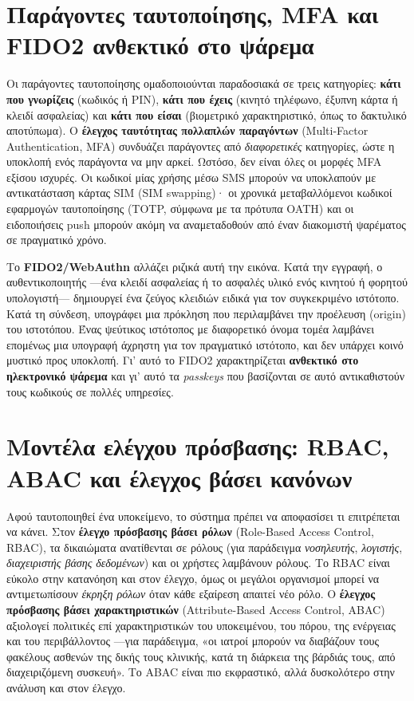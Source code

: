 \documentclass[11pt,openany]{book}
\begin{document}
\section{Παράγοντες ταυτοποίησης, MFA και FIDO2 ανθεκτικό στο ψάρεμα}\label{sec:8.2}
Οι παράγοντες ταυτοποίησης ομαδοποιούνται παραδοσιακά σε τρεις κατηγορίες: \textbf{κάτι που γνωρίζεις} (κωδικός ή PIN), \textbf{κάτι που έχεις} (κινητό τηλέφωνο, έξυπνη κάρτα ή κλειδί ασφαλείας) και \textbf{κάτι που είσαι} (βιομετρικό χαρακτηριστικό, όπως το δακτυλικό αποτύπωμα). Ο \textbf{έλεγχος ταυτότητας πολλαπλών παραγόντων} (Multi-Factor Authentication, MFA) συνδυάζει παράγοντες από \emph{διαφορετικές} κατηγορίες, ώστε η υποκλοπή ενός παράγοντα να μην αρκεί. Ωστόσο, δεν είναι όλες οι μορφές MFA εξίσου ισχυρές. Οι κωδικοί μίας χρήσης μέσω SMS μπορούν να υποκλαπούν με αντικατάσταση κάρτας SIM (SIM swapping)· οι χρονικά μεταβαλλόμενοι κωδικοί εφαρμογών ταυτοποίησης (TOTP, σύμφωνα με τα πρότυπα OATH) και οι ειδοποιήσεις push μπορούν ακόμη να αναμεταδοθούν από έναν διακομιστή ψαρέματος σε πραγματικό χρόνο.

Το \textbf{FIDO2/WebAuthn} αλλάζει ριζικά αυτή την εικόνα. Κατά την εγγραφή, ο αυθεντικοποιητής —ένα κλειδί ασφαλείας ή το ασφαλές υλικό ενός κινητού ή φορητού υπολογιστή— δημιουργεί ένα ζεύγος κλειδιών ειδικά για τον συγκεκριμένο ιστότοπο. Κατά τη σύνδεση, υπογράφει μια πρόκληση που περιλαμβάνει την προέλευση (origin) του ιστοτόπου. Ένας ψεύτικος ιστότοπος με διαφορετικό όνομα τομέα λαμβάνει επομένως μια υπογραφή άχρηστη για τον πραγματικό ιστότοπο, και δεν υπάρχει κοινό μυστικό προς υποκλοπή. Γι' αυτό το FIDO2 χαρακτηρίζεται \textbf{ανθεκτικό στο ηλεκτρονικό ψάρεμα} και γι' αυτό τα \emph{passkeys} που βασίζονται σε αυτό αντικαθιστούν τους κωδικούς σε πολλές υπηρεσίες.

\section{Μοντέλα ελέγχου πρόσβασης: RBAC, ABAC και έλεγχος βάσει κανόνων}\label{sec:8.3}
Αφού ταυτοποιηθεί ένα υποκείμενο, το σύστημα πρέπει να αποφασίσει τι επιτρέπεται να κάνει. Στον \textbf{έλεγχο πρόσβασης βάσει ρόλων} (Role-Based Access Control, RBAC), τα δικαιώματα ανατίθενται σε ρόλους (για παράδειγμα \emph{νοσηλευτής}, \emph{λογιστής}, \emph{διαχειριστής βάσης δεδομένων}) και οι χρήστες λαμβάνουν ρόλους. Το RBAC είναι εύκολο στην κατανόηση και στον έλεγχο, όμως οι μεγάλοι οργανισμοί μπορεί να αντιμετωπίσουν \emph{έκρηξη ρόλων} όταν κάθε εξαίρεση απαιτεί νέο ρόλο. Ο \textbf{έλεγχος πρόσβασης βάσει χαρακτηριστικών} (Attribute-Based Access Control, ABAC) αξιολογεί πολιτικές επί χαρακτηριστικών του υποκειμένου, του πόρου, της ενέργειας και του περιβάλλοντος —για παράδειγμα, «οι ιατροί μπορούν να διαβάζουν τους φακέλους ασθενών της δικής τους κλινικής, κατά τη διάρκεια της βάρδιάς τους, από διαχειριζόμενη συσκευή». Το ABAC είναι πιο εκφραστικό, αλλά δυσκολότερο στην ανάλυση και στον έλεγχο.
\end{document}
